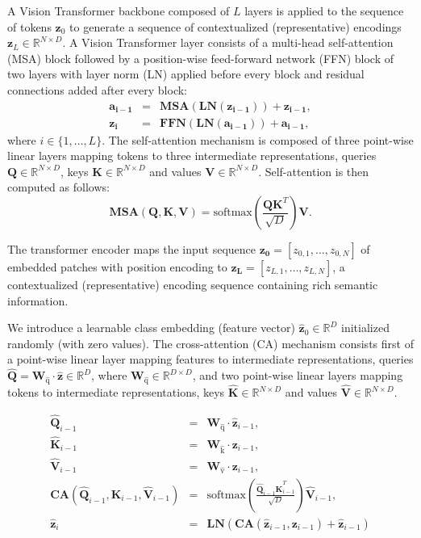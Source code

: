 \documentclass{article}
\theoremstyle{plain}
\theoremstyle{definition}
\theoremstyle{remark}
\begin{document}
A Vision Transformer backbone composed of $L$ layers is applied to the sequence of tokens $\mathbf{z}_0$ to generate a sequence of contextualized (representative) encodings $\mathbf{z}_L \in \mathbb{R}^{N \times D}$.
A Vision Transformer layer consists of a multi-head self-attention (MSA) block followed by a position-wise feed-forward network (FFN) block of two layers with layer norm (LN) applied before every block and residual connections added after every block:
\begin{eqnarray}
   \mathbf{a_{i-1}} &=& \mathbf{MSA}(\mathbf{LN}(\mathbf{z_{i-1}})) + \mathbf{z_{i-1}} , \\
   \mathbf{z_{i}} &=& \mathbf{FFN}(\mathbf{LN}(\mathbf{a_{i-1}})) + \mathbf{a_{i-1}},
\end{eqnarray}
where $i \in \{1,\ldots,L\}$.
The self-attention mechanism is composed of three point-wise linear layers mapping tokens to three intermediate representations, queries $\mathbf{Q} \in \mathbb{R}^{N \times D}$, keys $\mathbf{K} \in \mathbb{R}^{N \times D}$ and values $\mathbf{V} \in \mathbb{R}^{N \times D}$.
Self-attention is then computed as follows:
\begin{equation}
   \mathbf{MSA}(\mathbf{Q}, \mathbf{K}, \mathbf{V}) = \mathrm{softmax} \left( \frac{\mathbf{Q}\mathbf{K}^T}{\sqrt{D}} \right)  \mathbf{V}.
\end{equation}

The transformer encoder maps the input sequence $\mathbf{z_0} = [z_{0,1},\ldots,z_{0,N}]$ of embedded patches with position encoding to $\mathbf{z_L} = [z_{L,1},\ldots,z_{L,N}]$, a contextualized (representative) encoding sequence containing rich semantic information.

We introduce a learnable class embedding (feature vector) $\mathbf{\hat{z}}_0 \in \mathbb{R}^D$ initialized randomly (with zero values). 
The cross-attention (CA) mechanism consists first of a point-wise linear layer mapping features to intermediate representations, queries $\mathbf{\hat{Q}} = \mathbf{W}_{\hat{\mathrm{q}}} \cdot \mathbf{\hat{z}} \in \mathbb{R}^D $, where $\mathbf{W}_{\hat{\mathrm{q}}} \in \mathbb{R}^{D \times D} $, and two point-wise linear layers mapping tokens to intermediate representations, keys $\mathbf{\hat{K}} \in  \mathbb{R}^{N \times D}$ and values $\mathbf{\hat{V}} \in \mathbb{R}^{N \times D}$.

\begin{eqnarray}
   \mathbf{\hat{Q}}_{i-1} &=& \mathbf{W}_{\hat{\mathrm{q}}} \cdot \mathbf{\hat{z}}_{i-1}, \\
   \mathbf{\hat{K}}_{i-1} &=& \mathbf{W}_{\hat{\mathrm{k}}} \cdot \mathbf{z}_{i-1}, \\
   \mathbf{\hat{V}}_{i-1} &=& \mathbf{W}_{\hat{\mathrm{v}}} \cdot \mathbf{z}_{i-1}, \\
   \mathbf{CA}(\mathbf{\hat{Q}}_{i-1}, \mathbf{\hat{K}}_{i-1}, \mathbf{\hat{V}}_{i-1}) &=& \mathrm{softmax} \left( \frac{\mathbf{\hat{Q}}_{i-1} \mathbf{\hat{K}}_{i-1}^T}{\sqrt{D}} \right)  \mathbf{\hat{V}}_{i-1}, \\
   \mathbf{\hat{z}}_i &=& \mathbf{LN}(\mathbf{CA}(\mathbf{\hat{z}}_{i-1}, \mathbf{z}_{i-1}) + \mathbf{\hat{z}}_{i-1})
\end{eqnarray}
\end{document}

